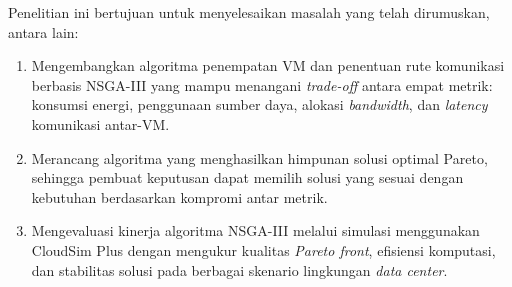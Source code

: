 Penelitian ini bertujuan untuk menyelesaikan masalah yang telah dirumuskan, antara lain:
 
\begin{enumerate}
  \item Mengembangkan algoritma penempatan VM dan penentuan rute komunikasi berbasis NSGA-III yang mampu menangani \textit{trade-off} antara empat metrik: konsumsi energi, penggunaan sumber daya, alokasi \textit{bandwidth}, dan \textit{latency} komunikasi antar-VM.
  \item Merancang algoritma yang menghasilkan himpunan solusi optimal Pareto, sehingga pembuat keputusan dapat memilih solusi yang sesuai dengan kebutuhan berdasarkan kompromi antar metrik.
  \item Mengevaluasi kinerja algoritma NSGA-III melalui simulasi menggunakan CloudSim Plus dengan mengukur kualitas \textit{Pareto front}, efisiensi komputasi, dan stabilitas solusi pada berbagai skenario lingkungan \textit{data center}.
\end{enumerate}  
